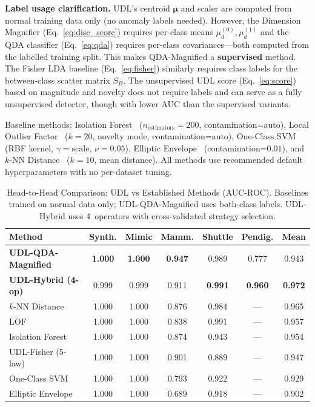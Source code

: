 \documentclass[journal]{IEEEtran}
\begin{document}
\textbf{Label usage clarification.} UDL's centroid $\boldsymbol{\mu}$ and scaler are computed from normal training data only (no anomaly labels needed). However, the Dimension Magnifier (Eq.~\eqref{eq:disc_score}) requires per-class means $\mu_d^{(0)}, \mu_d^{(1)}$ and the QDA classifier (Eq.~\eqref{eq:qda}) requires per-class covariances---both computed from the labelled training split. This makes QDA-Magnified a \textbf{supervised} method. The Fisher LDA baseline (Eq.~\eqref{eq:fisher}) similarly requires class labels for the between-class scatter matrix $S_B$. The unsupervised UDL score (Eq.~\eqref{eq:score}) based on magnitude and novelty does not require labels and can serve as a fully unsupervised detector, though with lower AUC than the supervised variants.

Baseline methods: Isolation Forest~\cite{liu2008isolation} ($n_{\text{estimators}}=200$, contamination=auto), Local Outlier Factor~\cite{breunig2000lof} ($k=20$, novelty mode, contamination=auto), One-Class SVM~\cite{scholkopf2001estimating} (RBF kernel, $\gamma=\text{scale}$, $\nu=0.05$), Elliptic Envelope~\cite{rousseeuw1999fast} (contamination=$0.01$), and $k$-NN Distance~\cite{ramaswamy2000efficient} ($k=10$, mean distance). All methods use recommended default hyperparameters with no per-dataset tuning.

\begin{table}[t]
\centering
\caption{Head-to-Head Comparison: UDL vs Established Methods (AUC-ROC). Baselines trained on normal data only; UDL-QDA-Magnified uses both-class labels. UDL-Hybrid uses 4~operators with cross-validated strategy selection.}
\label{tab:sota}
\begin{tabular}{@{}lcccccc@{}}
\toprule
\textbf{Method} & \textbf{Synth.} & \textbf{Mimic} & \textbf{Mamm.} & \textbf{Shuttle} & \textbf{Pendig.} & \textbf{Mean} \\
\midrule
\textbf{UDL-QDA-Magnified} & \textbf{1.000} & \textbf{1.000} & \textbf{0.947} & 0.989 & 0.777 & 0.943 \\
\textbf{UDL-Hybrid (4-op)} & 0.999 & 0.999 & 0.911 & \textbf{0.991} & \textbf{0.960} & \textbf{0.972} \\
\midrule
$k$-NN Distance~\cite{ramaswamy2000efficient} & 1.000 & 1.000 & 0.876 & 0.984 & --- & 0.965 \\
LOF~\cite{breunig2000lof} & 1.000 & 1.000 & 0.838 & 0.991 & --- & 0.957 \\
Isolation Forest~\cite{liu2008isolation} & 1.000 & 1.000 & 0.874 & 0.943 & --- & 0.954 \\
UDL-Fisher (5-law) & 1.000 & 1.000 & 0.901 & 0.889 & --- & 0.947 \\
One-Class SVM~\cite{scholkopf2001estimating} & 1.000 & 1.000 & 0.793 & 0.922 & --- & 0.929 \\
Elliptic Envelope~\cite{rousseeuw1999fast} & 1.000 & 1.000 & 0.689 & 0.918 & --- & 0.902 \\
\bottomrule
\end{tabular}
\end{table}
\end{document}
